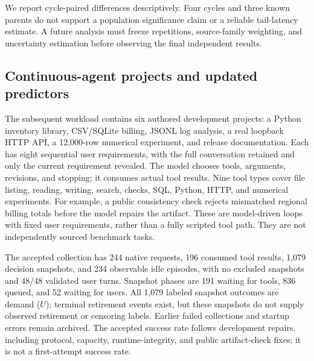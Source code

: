 \documentclass[sigconf, screen, review]{acmart}
\begin{document}
We report cycle-paired differences descriptively. Four cycles and three
known parents do not support a population significance claim or a
reliable tail-latency estimate. A future analysis must freeze
repetitions, source-family weighting, and uncertainty estimation before
observing the final independent results.


\subsection{Continuous-agent projects and updated predictors}
\label{continuous-setup}

The subsequent workload contains six authored development projects:
a Python inventory library, CSV/SQLite billing, JSONL log analysis,
a real loopback HTTP API, a 12,000-row numerical experiment, and release
documentation. Each has eight sequential user requirements, with the
full conversation retained and only the current requirement revealed.
The model chooses tools, arguments, revisions, and stopping; it consumes
actual tool results. Nine tool types cover file listing, reading,
writing, search, checks, SQL, Python, HTTP, and numerical experiments.
For example, a public consistency check rejects mismatched regional
billing totals before the model repairs the artifact. These are
model-driven loops with fixed user requirements, rather than a fully
scripted tool path. They are not independently sourced benchmark tasks.

The accepted collection has 244 native requests, 196 consumed tool
results, 1,079 decision snapshots, and 234 observable idle episodes,
with no excluded snapshots and 48/48 validated user turns. Snapshot
phases are 191 waiting for tools, 836 queued, and 52 waiting for users.
All 1,079 labeled snapshot outcomes are demand (\(U\)); terminal
retirement events exist, but these snapshots do not supply observed
retirement or censoring labels. Earlier failed collections and startup
errors remain archived. The accepted success rate follows development
repairs, including protocol, capacity, runtime-integrity, and public
artifact-check fixes; it is not a first-attempt success rate.
\end{document}
